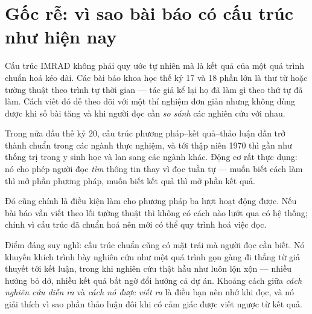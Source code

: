 \documentclass[../../english.tex]{subfiles}
\begin{document}
\section{Gốc rễ: vì sao bài báo có cấu trúc như hiện nay}

Cấu trúc IMRAD không phải quy ước tự nhiên mà là kết quả của một quá trình chuẩn hoá kéo dài. Các bài báo khoa học thế kỷ 17 và 18 phần lớn là thư từ hoặc tường thuật theo trình tự thời gian --- tác giả kể lại họ đã làm gì theo thứ tự đã làm. Cách viết đó dễ theo dõi với một thí nghiệm đơn giản nhưng không dùng được khi số bài tăng và khi người đọc cần \emph{so sánh} các nghiên cứu với nhau.

Trong nửa đầu thế kỷ 20, cấu trúc phương pháp--kết quả--thảo luận dần trở thành chuẩn trong các ngành thực nghiệm, và tới thập niên 1970 thì gần như thống trị trong y sinh học và lan sang các ngành khác. Động cơ rất thực dụng: nó cho phép người đọc \emph{tìm} thông tin thay vì đọc tuần tự --- muốn biết cách làm thì mở phần phương pháp, muốn biết kết quả thì mở phần kết quả.

Đó cũng chính là điều kiện làm cho phương pháp ba lượt hoạt động được. Nếu bài báo vẫn viết theo lối tường thuật thì không có cách nào lướt qua có hệ thống; chính vì cấu trúc đã chuẩn hoá nên mới có thể quy trình hoá việc đọc.

Điểm đáng suy nghĩ: cấu trúc chuẩn cũng có mặt trái mà người đọc cần biết. Nó khuyến khích trình bày nghiên cứu như một quá trình gọn gàng đi thẳng từ giả thuyết tới kết luận, trong khi nghiên cứu thật hầu như luôn lộn xộn --- nhiều hướng bỏ dở, nhiều kết quả bất ngờ đổi hướng cả dự án. Khoảng cách giữa \emph{cách nghiên cứu diễn ra} và \emph{cách nó được viết ra} là điều bạn nên nhớ khi đọc, và nó giải thích vì sao phần thảo luận đôi khi có cảm giác được viết ngược từ kết quả.

\begin{gocre}
\end{gocre}
\end{document}
